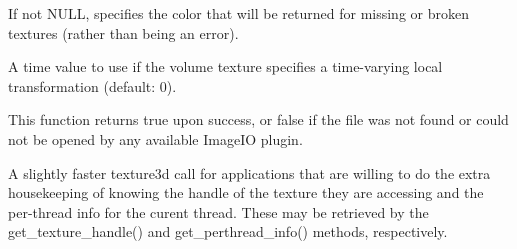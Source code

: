 \vspace{-24pt}
\vspace{10pt}
If not NULL, specifies the color that will be returned for missing or
broken textures (rather than being an error).
\apiend

\vspace{-24pt}
\vspace{10pt}
A time value to use if the volume texture specifies a time-varying
local transformation (default: 0).
\apiend

This function returns {\cf true} upon success, or {\cf false} if the
file was not found or could not be opened by any available ImageIO
plugin.

\apiend

A slightly faster {\cf texture3d} call for applications that are willing
to do the extra housekeeping of knowing the handle of the texture they
are accessing and the per-thread info for the curent thread.  These
may be retrieved by the {\cf get_texture_handle()} and 
{\cf get_perthread_info()} methods, respectively.
\apiend

